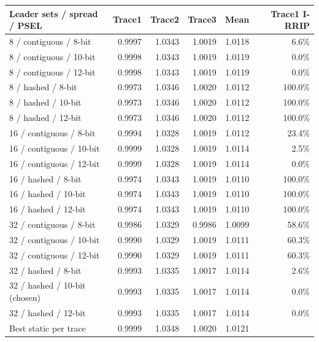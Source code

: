 \begin{tabular}{lrrrrr}\toprule
Leader sets / spread / PSEL & Trace1 & Trace2 & Trace3 & Mean & Trace1 I-RRIP \\ \midrule
8 / contiguous / 8-bit & 0.9997 & 1.0343 & 1.0019 & 1.0118 & 6.6\% \\
8 / contiguous / 10-bit & 0.9998 & 1.0343 & 1.0019 & 1.0119 & 0.0\% \\
8 / contiguous / 12-bit & 0.9998 & 1.0343 & 1.0019 & 1.0119 & 0.0\% \\
8 / hashed / 8-bit & 0.9973 & 1.0346 & 1.0020 & 1.0112 & 100.0\% \\
8 / hashed / 10-bit & 0.9973 & 1.0346 & 1.0020 & 1.0112 & 100.0\% \\
8 / hashed / 12-bit & 0.9973 & 1.0346 & 1.0020 & 1.0112 & 100.0\% \\
16 / contiguous / 8-bit & 0.9994 & 1.0328 & 1.0019 & 1.0112 & 23.4\% \\
16 / contiguous / 10-bit & 0.9999 & 1.0328 & 1.0019 & 1.0114 & 2.5\% \\
16 / contiguous / 12-bit & 0.9999 & 1.0328 & 1.0019 & 1.0114 & 0.0\% \\
16 / hashed / 8-bit & 0.9974 & 1.0343 & 1.0019 & 1.0110 & 100.0\% \\
16 / hashed / 10-bit & 0.9974 & 1.0343 & 1.0019 & 1.0110 & 100.0\% \\
16 / hashed / 12-bit & 0.9974 & 1.0343 & 1.0019 & 1.0110 & 100.0\% \\
32 / contiguous / 8-bit & 0.9986 & 1.0329 & 0.9986 & 1.0099 & 58.6\% \\
32 / contiguous / 10-bit & 0.9990 & 1.0329 & 1.0019 & 1.0111 & 60.3\% \\
32 / contiguous / 12-bit & 0.9990 & 1.0329 & 1.0019 & 1.0111 & 60.3\% \\
32 / hashed / 8-bit & 0.9993 & 1.0335 & 1.0017 & 1.0114 & 2.6\% \\
32 / hashed / 10-bit (chosen) & 0.9993 & 1.0335 & 1.0017 & 1.0114 & 0.0\% \\
32 / hashed / 12-bit & 0.9993 & 1.0335 & 1.0017 & 1.0114 & 0.0\% \\
\midrule
Best static per trace & 0.9999 & 1.0348 & 1.0020 & 1.0121 & \\
\bottomrule\end{tabular}

